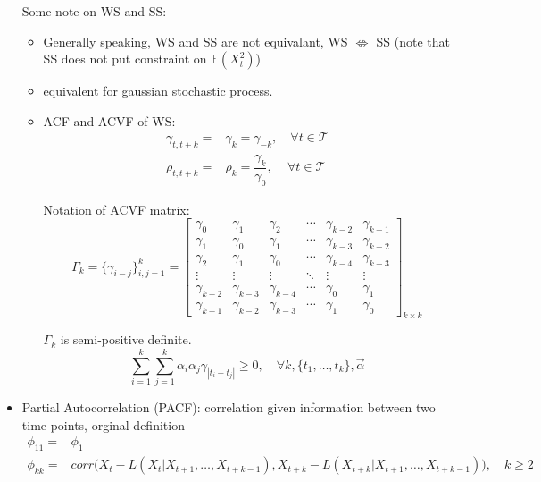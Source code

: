 \begin{itemize}[topsep=2pt,itemsep=0pt]
        Some note on WS and SS:
        \begin{itemize}[topsep=2pt,itemsep=0pt]
            \item Generally speaking, WS and SS are not equivalant, WS $ \nLeftrightarrow $ SS (note that SS does not put constraint on $ \mathbb{E}\left( X_t^2 \right)  $)
            \item equivalent for gaussian stochastic process.
            \item ACF and ACVF of WS: 
            \begin{align*}
                \gamma _{t,t+k}=&\gamma _k=\gamma _{-k},\quad \forall t\in\mathcal{T}\\
                \rho _{t,t+k}=&\rho _k=\dfrac{\gamma _k}{\gamma _0},\quad\, \forall t\in\mathcal{T}
            \end{align*}

            Notation of ACVF matrix:
            \begin{equation}
                \Gamma _k=\{\gamma _{i-j}\}_{i,j=1}^k=\begin{bmatrix}
                    \gamma _0&\gamma _1&\gamma _2&\cdots&\gamma _{k-2}&\gamma _{k-1}\\
                    \gamma _1&\gamma _0&\gamma _1&\cdots&\gamma _{k-3}&\gamma _{k-2}\\
                    \gamma _2&\gamma _1&\gamma _0&\cdots&\gamma _{k-4}&\gamma _{k-3}\\
                    \vdots&\vdots&\vdots&\ddots&\vdots&\vdots\\
                    \gamma _{k-2}&\gamma _{k-3}&\gamma _{k-4}&\cdots&\gamma _0&\gamma _1\\
                    \gamma _{k-1}&\gamma _{k-2}&\gamma _{k-3}&\cdots&\gamma _1&\gamma _0
                \end{bmatrix}_{k\times k}
            \end{equation}

            $ \Gamma _k $ is semi-positive definite. 
            \begin{equation}
                \sum_{i=1}^k\sum_{j=1}^k\alpha _i\alpha_ j\gamma _{|t_i-t_j|}\geq 0,\quad \forall k,\{t_1,\ldots,t_k\} ,\vec{\alpha }
            \end{equation}
            
        \end{itemize}
        \item Partial Autocorrelation (PACF): correlation given information between two time points, orginal definition
        \begin{align}\label{EqaPartialAutoCorrelation}
            \phi _{11}=&\phi _1\\
            \phi _{kk}=&corr\big(X_t-L(X_t|X_{t+1},\ldots,X_{t+k-1}),X_{t+k}-L(X_{t+k}|X_{t+1},\ldots,X_{t+k-1})\big),\quad k\geq 2
        \end{align}


\end{itemize}
